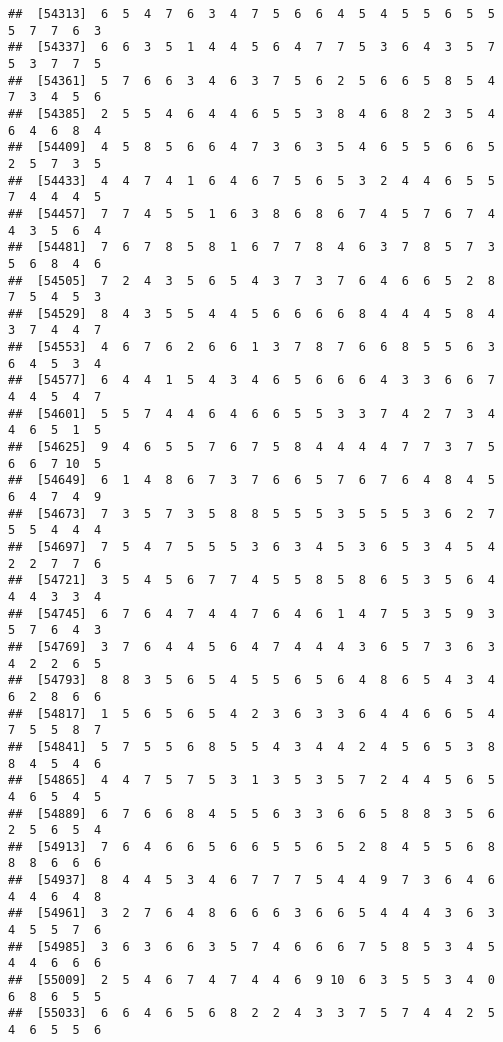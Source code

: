 \documentclass[
]{book}
\begin{document}
\begin{verbatim}
##  [54313]  6  5  4  7  6  3  4  7  5  6  6  4  5  4  5  5  6  5  5  5  7  7  6  3
##  [54337]  6  6  3  5  1  4  4  5  6  4  7  7  5  3  6  4  3  5  7  5  3  7  7  5
##  [54361]  5  7  6  6  3  4  6  3  7  5  6  2  5  6  6  5  8  5  4  7  3  4  5  6
##  [54385]  2  5  5  4  6  4  4  6  5  5  3  8  4  6  8  2  3  5  4  6  4  6  8  4
##  [54409]  4  5  8  5  6  6  4  7  3  6  3  5  4  6  5  5  6  6  5  2  5  7  3  5
##  [54433]  4  4  7  4  1  6  4  6  7  5  6  5  3  2  4  4  6  5  5  7  4  4  4  5
##  [54457]  7  7  4  5  5  1  6  3  8  6  8  6  7  4  5  7  6  7  4  4  3  5  6  4
##  [54481]  7  6  7  8  5  8  1  6  7  7  8  4  6  3  7  8  5  7  3  5  6  8  4  6
##  [54505]  7  2  4  3  5  6  5  4  3  7  3  7  6  4  6  6  5  2  8  7  5  4  5  3
##  [54529]  8  4  3  5  5  4  4  5  6  6  6  6  8  4  4  4  5  8  4  3  7  4  4  7
##  [54553]  4  6  7  6  2  6  6  1  3  7  8  7  6  6  8  5  5  6  3  6  4  5  3  4
##  [54577]  6  4  4  1  5  4  3  4  6  5  6  6  6  4  3  3  6  6  7  4  4  5  4  7
##  [54601]  5  5  7  4  4  6  4  6  6  5  5  3  3  7  4  2  7  3  4  4  6  5  1  5
##  [54625]  9  4  6  5  5  7  6  7  5  8  4  4  4  4  7  7  3  7  5  6  6  7 10  5
##  [54649]  6  1  4  8  6  7  3  7  6  6  5  7  6  7  6  4  8  4  5  6  4  7  4  9
##  [54673]  7  3  5  7  3  5  8  8  5  5  5  3  5  5  5  3  6  2  7  5  5  4  4  4
##  [54697]  7  5  4  7  5  5  5  3  6  3  4  5  3  6  5  3  4  5  4  2  2  7  7  6
##  [54721]  3  5  4  5  6  7  7  4  5  5  8  5  8  6  5  3  5  6  4  4  4  3  3  4
##  [54745]  6  7  6  4  7  4  4  7  6  4  6  1  4  7  5  3  5  9  3  5  7  6  4  3
##  [54769]  3  7  6  4  4  5  6  4  7  4  4  4  3  6  5  7  3  6  3  4  2  2  6  5
##  [54793]  8  8  3  5  6  5  4  5  5  6  5  6  4  8  6  5  4  3  4  6  2  8  6  6
##  [54817]  1  5  6  5  6  5  4  2  3  6  3  3  6  4  4  6  6  5  4  7  5  5  8  7
##  [54841]  5  7  5  5  6  8  5  5  4  3  4  4  2  4  5  6  5  3  8  8  4  5  4  6
##  [54865]  4  4  7  5  7  5  3  1  3  5  3  5  7  2  4  4  5  6  5  4  6  5  4  5
##  [54889]  6  7  6  6  8  4  5  5  6  3  3  6  6  5  8  8  3  5  6  2  5  6  5  4
##  [54913]  7  6  4  6  6  5  6  6  5  5  6  5  2  8  4  5  5  6  8  8  8  6  6  6
##  [54937]  8  4  4  5  3  4  6  7  7  7  5  4  4  9  7  3  6  4  6  4  4  6  4  8
##  [54961]  3  2  7  6  4  8  6  6  6  3  6  6  5  4  4  4  3  6  3  4  5  5  7  6
##  [54985]  3  6  3  6  6  3  5  7  4  6  6  6  7  5  8  5  3  4  5  4  4  6  6  6
##  [55009]  2  5  4  6  7  4  7  4  4  6  9 10  6  3  5  5  3  4  0  6  8  6  5  5
##  [55033]  6  6  4  6  5  6  8  2  2  4  3  3  7  5  7  4  4  2  5  4  6  5  5  6

\end{verbatim}
\end{document}
